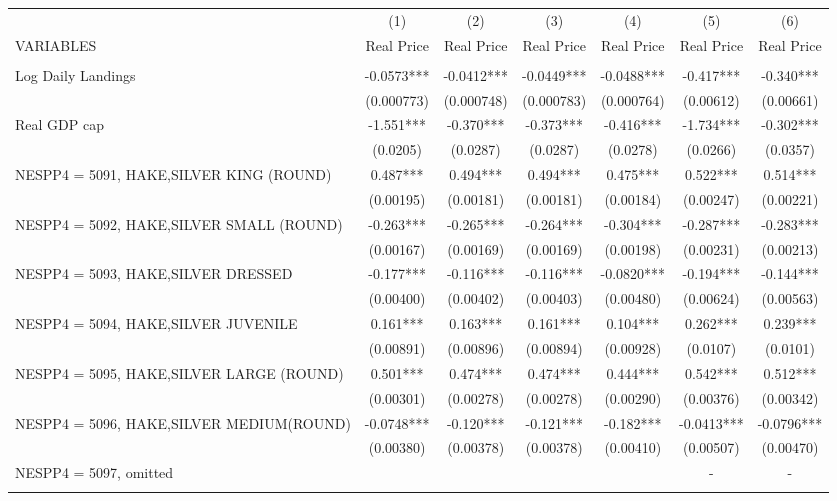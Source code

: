 \begin{tabular}{lcccccc} \hline
 & (1) & (2) & (3) & (4) & (5) & (6) \\
VARIABLES & Real Price & Real Price & Real Price & Real Price & Real Price & Real Price \\ \hline
 &  &  &  &  &  &  \\
Log Daily Landings & -0.0573*** & -0.0412*** & -0.0449*** & -0.0488*** & -0.417*** & -0.340*** \\
 & (0.000773) & (0.000748) & (0.000783) & (0.000764) & (0.00612) & (0.00661) \\
Real GDP cap & -1.551*** & -0.370*** & -0.373*** & -0.416*** & -1.734*** & -0.302*** \\
 & (0.0205) & (0.0287) & (0.0287) & (0.0278) & (0.0266) & (0.0357) \\
NESPP4 = 5091, HAKE,SILVER KING (ROUND) & 0.487*** & 0.494*** & 0.494*** & 0.475*** & 0.522*** & 0.514*** \\
 & (0.00195) & (0.00181) & (0.00181) & (0.00184) & (0.00247) & (0.00221) \\
NESPP4 = 5092, HAKE,SILVER SMALL (ROUND) & -0.263*** & -0.265*** & -0.264*** & -0.304*** & -0.287*** & -0.283*** \\
 & (0.00167) & (0.00169) & (0.00169) & (0.00198) & (0.00231) & (0.00213) \\
NESPP4 = 5093, HAKE,SILVER DRESSED & -0.177*** & -0.116*** & -0.116*** & -0.0820*** & -0.194*** & -0.144*** \\
 & (0.00400) & (0.00402) & (0.00403) & (0.00480) & (0.00624) & (0.00563) \\
NESPP4 = 5094, HAKE,SILVER JUVENILE & 0.161*** & 0.163*** & 0.161*** & 0.104*** & 0.262*** & 0.239*** \\
 & (0.00891) & (0.00896) & (0.00894) & (0.00928) & (0.0107) & (0.0101) \\
NESPP4 = 5095, HAKE,SILVER LARGE (ROUND) & 0.501*** & 0.474*** & 0.474*** & 0.444*** & 0.542*** & 0.512*** \\
 & (0.00301) & (0.00278) & (0.00278) & (0.00290) & (0.00376) & (0.00342) \\
NESPP4 = 5096, HAKE,SILVER MEDIUM(ROUND) & -0.0748*** & -0.120*** & -0.121*** & -0.182*** & -0.0413*** & -0.0796*** \\
 & (0.00380) & (0.00378) & (0.00378) & (0.00410) & (0.00507) & (0.00470) \\
NESPP4 = 5097, omitted &  &  &  &  & - & - \\
 &  &  &  &  &  &  \\

\end{tabular}
